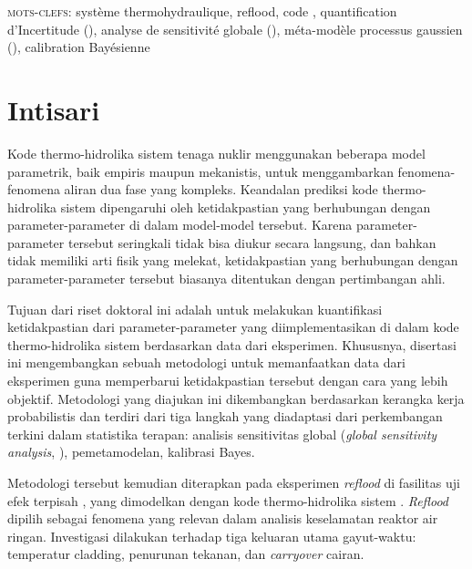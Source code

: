 \begin{otherlanguage}{ngerman}
\vfill

\textsc{mots-clefs}:
système thermohydraulique,
reflood,
code ,
quantification d'Incertitude (),
analyse de sensitivité globale (),
méta-modèle processus gaussien (),
calibration Bayésienne

\end{otherlanguage}

\newpage

\chapter*{Intisari}

Kode thermo-hidrolika sistem tenaga nuklir menggunakan beberapa model parametrik, baik empiris maupun mekanistis, untuk menggambarkan fenomena-fenomena aliran dua fase yang kompleks.   
Keandalan prediksi kode thermo-hidrolika sistem dipengaruhi oleh ketidakpastian yang berhubungan dengan parameter-parameter di dalam model-model tersebut.
Karena parameter-parameter tersebut seringkali tidak bisa diukur secara langsung, dan bahkan tidak memiliki arti fisik yang melekat, ketidakpastian yang berhubungan dengan parame\-ter-parameter tersebut biasanya ditentukan dengan pertimbangan ahli.

Tujuan dari riset doktoral ini adalah untuk melakukan kuantifikasi ketidakpastian dari parameter-parameter yang diimplementasikan di dalam kode thermo-hidrolika sistem berdasarkan data dari eksperimen.
Khususnya, disertasi ini mengembangkan sebuah metodologi untuk memanfaatkan data dari eksperimen guna memperbarui ketidakpastian tersebut dengan cara yang lebih objektif.
Metodologi yang diajukan ini dikembangkan berdasarkan kerangka kerja probabilistis dan terdiri dari tiga langkah yang diadaptasi dari perkembang\-an terkini dalam statistika terapan:
analisis sensitivitas global (\emph{global sensitivity analysis}, ), pemetamodelan, kalibrasi Bayes.

Metodologi tersebut kemudian diterapkan pada eksperimen \emph{reflood} di fasilitas uji efek terpisah , yang dimodelkan dengan kode thermo-hidrolika sistem .
\emph{Reflood} dipilih sebagai fenomena yang relevan dalam analisis keselamatan reaktor air ringan.
Investigasi dilakukan terhadap tiga keluaran utama gayut-waktu: temperatur cladding, penurunan tekanan, dan \emph{carryover} cairan.

